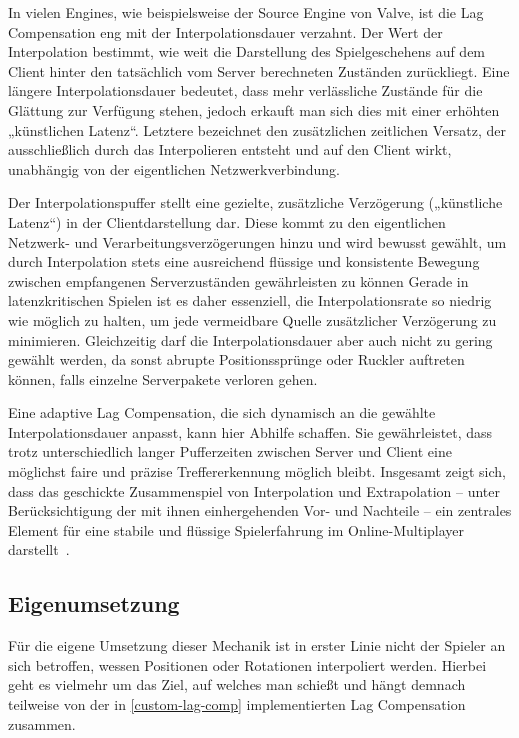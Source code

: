 \begin{enumerate}
In vielen Engines, wie beispielsweise der Source Engine von Valve, ist die Lag Compensation eng mit der Interpolationsdauer verzahnt. Der Wert der Interpolation bestimmt, wie weit die Darstellung des Spielgeschehens auf dem Client hinter den tatsächlich vom Server berechneten Zuständen zurückliegt. Eine längere Interpolationsdauer bedeutet, dass mehr verlässliche Zustände für die Glättung zur Verfügung stehen, jedoch erkauft man sich dies mit einer erhöhten „künstlichen Latenz“. Letztere bezeichnet den zusätzlichen zeitlichen Versatz, der ausschließlich durch das Interpolieren entsteht und auf den Client wirkt, unabhängig von der eigentlichen Netzwerkverbindung. 

Der Interpolationspuffer stellt eine gezielte, zusätzliche Verzögerung („künstliche Latenz“) in der Clientdarstellung dar. Diese kommt zu den eigentlichen Netzwerk- und Verarbeitungsverzögerungen hinzu und wird bewusst gewählt, um durch Interpolation stets eine ausreichend flüssige und konsistente Bewegung zwischen empfangenen Serverzuständen gewährleisten zu können Gerade in latenzkritischen Spielen ist es daher essenziell, die Interpolationsrate so niedrig wie möglich zu halten, um jede vermeidbare Quelle zusätzlicher Verzögerung zu minimieren. Gleichzeitig darf die Interpolationsdauer aber auch nicht zu gering gewählt werden, da sonst abrupte Positionssprünge oder Ruckler auftreten können, falls einzelne Serverpakete verloren gehen.

Eine adaptive Lag Compensation, die sich dynamisch an die gewählte Interpolationsdauer anpasst, kann hier Abhilfe schaffen. Sie gewährleistet, dass trotz unterschiedlich langer Pufferzeiten zwischen Server und Client eine möglichst faire und präzise Treffererkennung möglich bleibt. Insgesamt zeigt sich, dass das geschickte Zusammenspiel von Interpolation und Extrapolation – unter Berücksichtigung der mit ihnen einhergehenden Vor- und Nachteile – ein zentrales Element für eine stabile und flüssige Spielerfahrung im Online-Multiplayer darstellt~\cite{valveInterpolation}.

\newpage

\subsection{Eigenumsetzung}
Für die eigene Umsetzung dieser Mechanik ist in erster Linie nicht der Spieler an sich betroffen, wessen Positionen oder Rotationen interpoliert werden. Hierbei geht es vielmehr um das Ziel, auf welches man schießt und hängt demnach teilweise von der in \ref{custom-lag-comp} implementierten Lag Compensation zusammen.


\end{enumerate}
